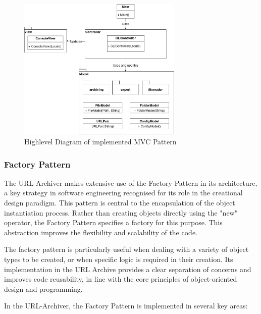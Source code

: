 \begin{figure}[h!]
    \center
    \includegraphics[width=0.7\textwidth]{diagrams/mvc_diagram-Highlevel_MVC.png}
    \caption{Highlevel Diagram of implemented MVC Pattern }
    \label{fig:MVC_Highlevel}
\end{figure}

\clearpage

\subsubsection{Factory Pattern}
The URL-Archiver makes extensive use of the Factory Pattern  in its architecture, a key strategy in software engineering recognised for its role in the creational design paradigm. This pattern is central to the encapsulation of the object instantiation process. Rather than creating objects directly using the "new" operator, the Factory Pattern  specifies a factory for this purpose. This abstraction improves the flexibility and scalability of the code.

The factory pattern is particularly useful when dealing with a variety of object types to be created, or when specific logic is required in their creation. Its implementation in the URL Archive provides a clear separation of concerns and improves code reusability, in line with the core principles of object-oriented design and programming.

In the URL-Archiver, the Factory Pattern  is implemented in several key areas:

